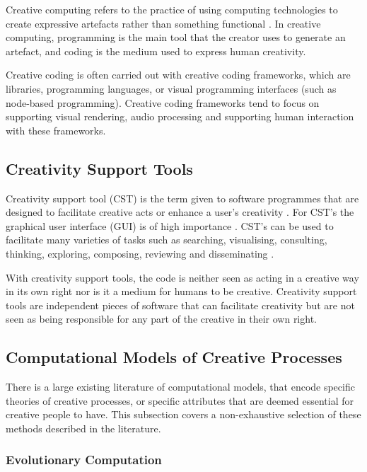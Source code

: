 Creative computing refers to the practice of using computing technologies to create expressive artefacts rather than something functional \citep{yang2016promoting}.
In creative computing, programming is the main tool that the creator uses to generate an artefact, and coding is the medium used to express human creativity. 

Creative coding is often carried out with creative coding frameworks, which are libraries, programming languages, or visual programming interfaces (such as node-based programming). 
Creative coding frameworks tend to focus on supporting visual rendering, audio processing and supporting human interaction with these frameworks. 


\subsection{Creativity Support Tools}
\label{c2:subsec:cst}

Creativity support tool (CST) is the term given to software programmes that are designed to facilitate creative acts or enhance a user's creativity \citep{shneiderman2002creativity}. 
For CST’s the graphical user interface (GUI) is of high importance \citep{shneiderman1999user}. 
CST’s can be used to facilitate many varieties of tasks such as searching, visualising, consulting, thinking, exploring, composing, reviewing and disseminating \citep{shneiderman2002cst_tutorial}.

With creativity support tools, the code is neither seen as acting in a creative way in its own right nor is it a medium for humans to be creative. 
Creativity support tools are independent pieces of software that can facilitate creativity but are not seen as being responsible for any part of the creative in their own right.

\subsection{Computational Models of Creative Processes}

There is a large existing literature of computational models, that encode specific theories of creative processes, or specific attributes that are deemed essential for creative people to have. 
This subsection covers a non-exhaustive selection of these methods described in the literature.

\subsubsection{Evolutionary Computation}

